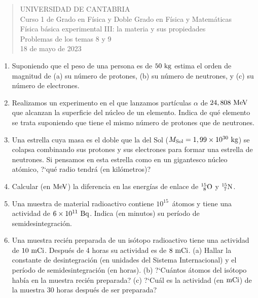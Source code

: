 \documentclass[11pt]{articulo}
\begin{document}
\begin{verse}
{\Large UNIVERSIDAD DE CANTABRIA}\\ 
\vspace*{0.5cm}
{\normalsize \rm Curso 1 de Grado en F\'isica y Doble Grado en F\'isica y Matem\'aticas}\\
{\normalsize \rm F\'isica b\'asica experimental III: la materia y sus propiedades}\\ 
{\normalsize \rm Problemas de los temas 8 y 9}\\
{\normalsize \rm 18 de mayo de 2023}\\
\end{verse} 

\vspace*{0.25cm}

\begin{enumerate}

\item Suponiendo que el peso de una persona es de $50~{\rm kg}$ estima el orden de magnitud de (a) su n\'umero de protones, (b) su n\'umero de neutrones, y (c) su n\'umero de electrones.

\item Realizamos un experimento en el que lanzamos part\'iculas $\alpha$ de $24,808~{\rm MeV}$ que alcanzan la superficie del n\'ucleo de un elemento. Indica de qu\'e elemento se trata suponiendo que tiene el mismo n\'umero de protones que de neutrones.

\item Una estrella cuya masa es el doble que la del Sol ($M_{\rm Sol} = 1,99 \times 10^{30}~{\rm kg}$) se colapsa combinando sus protones y sus electrones para formar una estrella de neutrones. Si pensamos en esta estrella como en un gigantesco n\'ucleo at\'omico, ?`qu\'e radio tendr\'a (en kil\'ometros)?

\item Calcular (en ${\rm MeV}$) la diferencia en las energ\'ias de enlace de $_{~8}^{15}{\rm O}$ y $_{~7}^{15}{\rm N}$.

\item Una muestra de material radioactivo contiene $10^{15}$~\'atomos y tiene una actividad de $6\times 10^{11}~{\rm Bq}$. Indica (en minutos) su per\'iodo de semidesintegraci\'on.

\item Una muestra reci\'en preparada de un is\'otopo radioactivo tiene una actividad de $10~{\rm mCi}$. Despu\'es de 4 horas su actividad es de $8~{\rm mCi}$. (a) Hallar la constante de desintegraci\'on (en unidades del Sistema Internacional) y el per\'iodo de semidesintegraci\'on (en horas). (b) ?`Cu\'antos \'atomos del is\'otopo hab\'ia en la muestra reci\'en preparada? (c) ?`Cu\'al es la actividad (en ${\rm mCi}$) de la muestra 30 horas despu\'es de ser preparada?


\end{enumerate}
\end{document}
